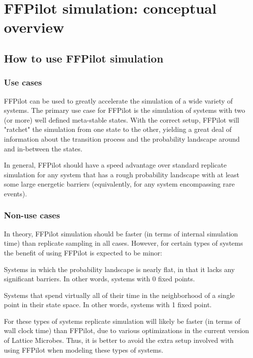 \chapter{FFPilot simulation: conceptual overview}
\section{How to use FFPilot simulation}

\subsection{Use cases}

FFPilot can be used to greatly accelerate the simulation of a wide variety of systems. The primary use case for FFPilot is the simulation of systems with two (or more) well defined meta-stable states. With the correct setup, FFPilot will "ratchet" the simulation from one state to the other, yielding a great deal of information about the transition process and the probability landscape around and in-between the states.

In general, FFPilot should have a speed advantage over standard replicate simulation for any system that has a rough probability landscape with at least some large energetic barriers (equivalently, for any system encompassing rare events). 

\subsection{Non-use cases}

In theory, FFPilot simulation should be faster (in terms of internal simulation time) than replicate sampling in all cases. However, for certain types of systems the benefit of using FFPilot is expected to be minor:
\begin{description}[style=nextline]
    \item [$\bullet$ Systems with flat landscapes/no rare events]
    
        Systems in which the probability landscape is nearly flat, in that it lacks any significant barriers. In other words, systems with 0 fixed points.
    
    \item [$\bullet$ One-state systems]
    
        Systems that spend virtually all of their time in the neighborhood of a single point in their state space. In other words, systems with 1 fixed point.

\end{description}
For these types of systems replicate simulation will likely be faster (in terms of wall clock time) than FFPilot, due to various optimizations in the current version of Lattice Microbes. Thus, it is better to avoid the extra setup involved with using FFPilot when modeling these types of systems.

